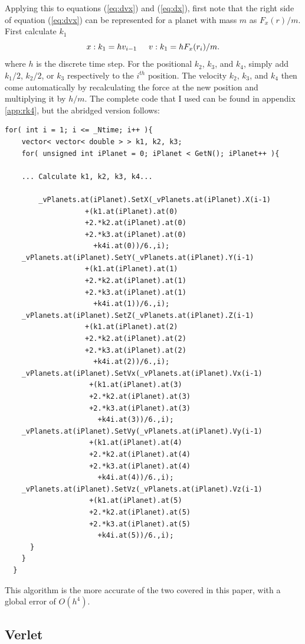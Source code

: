 \documentclass[a4paper,12pt]{report}
\begin{document}
Applying this to equations (\ref{eq:dvx}) and (\ref{eq:dx}), first note that the right side of equation 
(\ref{eq:dvx}) can be represented for a planet with mass $m$ as $F_x(r)/m$. First calculate $k_1$
\begin{equation}
 x: k_1 = hv_{i-1} \hspace{0.5cm} v: k_1 = hF_x(r_{i})/m.
\end{equation}
where $h$ is the discrete time step. For the positional $k_2$, $k_3$, and $k_4$, simply add $k_1/2$, $k_2/2$, or $k_3$ respectively to the $i^{th}$ position. The velocity $k_2$, $k_3$, and $k_4$ then come automatically by recalculating the force at the new position and multiplying it by $h/m$. The complete code that I used can be found in appendix \ref{app:rk4}, but the abridged version follows:

\singlespacing
\begin{Verbatim}[fontsize=\small]
   for( int i = 1; i <= _Ntime; i++ ){
    vector< vector< double > > k1, k2, k3; 
    for( unsigned int iPlanet = 0; iPlanet < GetN(); iPlanet++ ){
    
    ... Calculate k1, k2, k3, k4...
    
    	_vPlanets.at(iPlanet).SetX(_vPlanets.at(iPlanet).X(i-1)
				   +(k1.at(iPlanet).at(0)
				   +2.*k2.at(iPlanet).at(0)
				   +2.*k3.at(iPlanet).at(0)
				     +k4i.at(0))/6.,i);
	_vPlanets.at(iPlanet).SetY(_vPlanets.at(iPlanet).Y(i-1)
				   +(k1.at(iPlanet).at(1)
				   +2.*k2.at(iPlanet).at(1)
				   +2.*k3.at(iPlanet).at(1)
				     +k4i.at(1))/6.,i);
	_vPlanets.at(iPlanet).SetZ(_vPlanets.at(iPlanet).Z(i-1)
				   +(k1.at(iPlanet).at(2)
				   +2.*k2.at(iPlanet).at(2)
				   +2.*k3.at(iPlanet).at(2)
				     +k4i.at(2))/6.,i);
	_vPlanets.at(iPlanet).SetVx(_vPlanets.at(iPlanet).Vx(i-1)
				    +(k1.at(iPlanet).at(3)
				    +2.*k2.at(iPlanet).at(3)
				    +2.*k3.at(iPlanet).at(3)
				      +k4i.at(3))/6.,i);
	_vPlanets.at(iPlanet).SetVy(_vPlanets.at(iPlanet).Vy(i-1)
				    +(k1.at(iPlanet).at(4)
				    +2.*k2.at(iPlanet).at(4)
				    +2.*k3.at(iPlanet).at(4)
				      +k4i.at(4))/6.,i);
	_vPlanets.at(iPlanet).SetVz(_vPlanets.at(iPlanet).Vz(i-1)
				    +(k1.at(iPlanet).at(5)
				    +2.*k2.at(iPlanet).at(5)
				    +2.*k3.at(iPlanet).at(5)
				      +k4i.at(5))/6.,i);
      }
    }
  }
\end{Verbatim}

This algorithm is the more accurate of the two covered in this paper, with a global error of $O(h^4)$.
\doublespacing


\subsection{Verlet}
\end{document}
